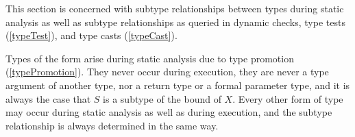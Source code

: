 \documentclass[makeidx]{article}
\begin{document}
{\LMHash{}%
This section is concerned with subtype relationships between types
during static analysis
as well as subtype relationships as queried in dynamic checks,
type tests
(\ref{typeTest}),
and type casts
(\ref{typeCast}).


\LMHash{}%
Types of the form
%
arise during static analysis due to type promotion
(\ref{typePromotion}).
They never occur during execution,
they are never a type argument of another type,
nor a return type or a formal parameter type,
and it is always the case that $S$ is a subtype of the bound of $X$.
Every other form of type may occur during static analysis
as well as during execution,
and the subtype relationship is always determined in the same way.

\newcommand{\SrnReflexivity}{1}
\newcommand{\SrnTop}{2}
\newcommand{\SrnBottom}{3}
\newcommand{\SrnNull}{4}
\newcommand{\SrnLeftTypeAlias}{5}
\newcommand{\SrnRightTypeAlias}{6}
\newcommand{\SrnLeftFutureOr}{7}
\newcommand{\SrnTypeVariableReflexivityA}{8}
\newcommand{\SrnRightPromotedVariable}{9}
\newcommand{\SrnRightFutureOrA}{10}
\newcommand{\SrnRightFutureOrB}{11}
\newcommand{\SrnLeftPromotedVariable}{12}
\newcommand{\SrnLeftVariableBound}{13}
\newcommand{\SrnRightFunction}{14}
\newcommand{\SrnPositionalFunctionType}{15}
\newcommand{\SrnNamedFunctionType}{16}
\newcommand{\SrnCovariance}{17}
\newcommand{\SrnSuperinterface}{18}

}
\end{document}
